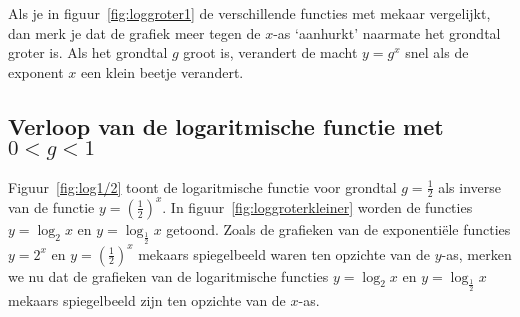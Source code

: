 Als je in figuur~\ref{fig:loggroter1} de verschillende functies met mekaar vergelijkt, dan merk je dat de grafiek meer tegen de $x$-as `aanhurkt' naarmate het grondtal groter is. Als het grondtal $g$ groot is, verandert de macht $y=g^x$ snel als de exponent $x$ een klein beetje verandert. 

\subsection[Verloop van de logaritmische functie met
$0<g<1$] {Verloop van de logaritmische functie met
\boldmath$0<g<1$\unboldmath} 

Figuur~\ref{fig:log1/2} toont de
logaritmische functie voor grondtal $g=\frac{1}{2}$ als inverse van de functie $y=\left(\frac12\right)^x$. 
In figuur~\ref{fig:loggroterkleiner} worden de functies $y=\log_2x$ en $y=\log_{\frac12}x$ getoond. Zoals de grafieken van de exponenti\"ele functies $y=2^x$ en $y=\left(\frac12\right)^x$ mekaars spiegelbeeld waren ten opzichte van de $y$-as, merken we nu dat de grafieken van de logaritmische functies  $y=\log_2x$ en $y=\log_{\frac12}x$ mekaars spiegelbeeld zijn ten opzichte van de $x$-as. 

